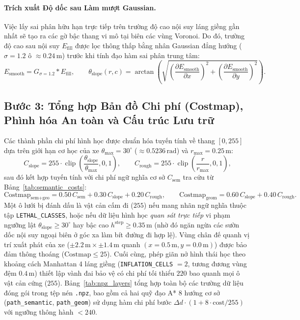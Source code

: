 \documentclass[a4paper,fleqn]{cas-sc}
\begin{document}
\paragraph{Trích xuất Độ dốc sau Làm mượt Gaussian.}
Việc lấy sai phân hữu hạn trực tiếp trên trường độ cao nội suy láng giềng gần nhất sẽ tạo ra các gờ bậc thang vi mô tại biên các vùng Voronoi. Do đó, trường độ cao sau nội suy $E_{\text{fill}}$ được lọc thông thấp bằng nhân Gaussian đẳng hướng ($\sigma = 1.2$ ô $\approx 0.24\,\text{m}$) trước khi tính đạo hàm sai phân trung tâm:
\begin{equation}
    E_{\text{smooth}} = G_{\sigma=1.2} * E_{\text{fill}}, \qquad
    \theta_{\text{slope}}(r, c) = \arctan\left(\sqrt{\left(\frac{\partial E_{\text{smooth}}}{\partial x}\right)^2 + \left(\frac{\partial E_{\text{smooth}}}{\partial y}\right)^2}\right).
\end{equation}

\subsection{Bước 3: Tổng hợp Bản đồ Chi phí (Costmap), Phình hóa An toàn và Cấu trúc Lưu trữ}
Các thành phần chi phí hình học được chuẩn hóa tuyến tính về thang $[0, 255]$ dựa trên giới hạn cơ học của xe $\theta_{\max} = 30^\circ$ ($\approx 0.5236\,\text{rad}$) và $r_{\max} = 0.25\,\text{m}$:
\begin{equation}
    C_{\text{slope}} = 255 \cdot \operatorname{clip}\left(\frac{\theta_{\text{slope}}}{\theta_{\max}}, 0, 1\right), \qquad
    C_{\text{rough}} = 255 \cdot \operatorname{clip}\left(\frac{r}{r_{\max}}, 0, 1\right),
\end{equation}
sau đó kết hợp tuyến tính với chi phí ngữ nghĩa cơ sở $C_{\text{sem}}$ tra cứu từ Bảng~\ref{tab:semantic_costs}:
\begin{equation}
    \text{Costmap}_{\text{sem+geo}} = 0.50\,C_{\text{sem}} + 0.30\,C_{\text{slope}} + 0.20\,C_{\text{rough}}, \qquad
    \text{Costmap}_{\text{geom}} = 0.60\,C_{\text{slope}} + 0.40\,C_{\text{rough}}.
\end{equation}
Một ô lưới bị đánh dấu là vật cản cấm đi ($255$) nếu mang nhãn ngữ nghĩa thuộc tập \texttt{LETHAL\_CLASSES}, hoặc nếu dữ liệu hình học \emph{quan sát trực tiếp} vi phạm ngưỡng lật $\theta_{\text{slope}} \ge 30^\circ$ hay bậc cao $h^{\text{step}} \ge 0.35\,\text{m}$ (nhờ đó ngăn ngừa các sườn dốc nội suy ngoại biên ở góc xa làm bít đường đi hợp lệ). Vùng chân đế quanh vị trí xuất phát của xe ($\pm 2.2\,\text{m} \times \pm 1.4\,\text{m}$ quanh $(x=0.5\,\text{m}, y=0.0\,\text{m})$) được bảo đảm thông thoáng ($\text{Costmap} \le 25$). Cuối cùng, phép giãn nở hình thái học theo khoảng cách Manhattan 4 láng giềng (\texttt{INFLATION\_CELLS} $= 2$, tương đương vùng đệm $0.4\,\text{m}$) thiết lập vành đai bảo vệ có chi phí tối thiểu $220$ bao quanh mọi ô vật cản cứng ($255$). Bảng~\ref{tab:npz_layers} tổng hợp toàn bộ các trường dữ liệu đóng gói trong tệp nén \texttt{.npz}, bao gồm cả hai quỹ đạo A* 8 hướng cơ sở (\texttt{path\_semantic}, \texttt{path\_geom}) sử dụng hàm chi phí bước $\Delta d \cdot (1 + 8 \cdot \text{cost}/255)$ với ngưỡng thông hành $< 240$.
\end{document}
